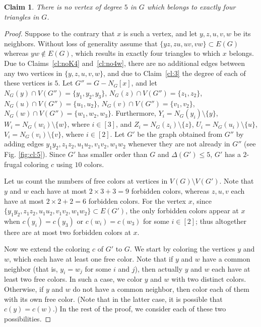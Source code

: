 \documentclass[10pt,a4paper]{article}
\newtheorem{claim}{Claim}
\begin{document}
\begin{claim} There is no vertex of degree $5$ in $G$ which belongs to exactly four triangles in $G$.
\label{cl:5}
\end{claim} 
\begin{proof}
Suppose to the contrary that $x$ is such a vertex, and let $y,z,u,v, w$ be its neighbors. Without loss of generality assume that   $\{yz,zu,uv,vw\}\subset E(G)$ whereas $yw\notin E(G)$, which results in exactly four triangles to which $x$ belongs. Due to Claims~\ref{cl:noK4} and~\ref{cl:no4w}, there are no additional edges between any two vertices in $\{y,z,u,v,w\}$, and due to Claim~\ref{cl:3} the degree of each of these vertices is $5$. Let $G''=G-N_G[x]$,  and let $N_G(y)\cap V(G'')=\{y_1,y_2,y_3\}$,  $N_G(z)\cap V(G'')=\{z_1,z_2\}$, $N_G(u)\cap V(G'')=\{u_1,u_2\}$, $N_G(v)\cap V(G'')=\{v_1,v_2\}$, $N_G(w)\cap V(G'')=\{w_1,w_2,w_3\}$. Furthermore, $Y_i =N_G(y_i)\setminus\{y\}$, $W_i =N_G(w_i)\setminus\{w\}$, where $i\in[3]$, and $Z_i =N_G(z_i)\setminus\{z\}$, $U_i =N_G(u_i)\setminus\{u\}$, $V_i =N_G(v_i)\setminus\{v\}$, where $i\in [2]$. 
Let $G'$ be the graph obtained from $G''$ by adding edges $y_1y_2,z_1z_2,u_1u_2,v_1v_2, w_1w_2$ whenever they are not already in $G''$ (see Fig. \ref{fig:cl:5}). Since $G'$ has smaller order than $G$ and $\Delta(G')\le 5$, $G'$ has a $2$-frugal coloring $c$ using $10$ colors.

Let us count the numbers of free colors at vertices in $V(G)\setminus V(G')$. Note that $y$ and $w$ each have at most 
$2\times 3+ 3=9$ forbidden colors, whereas $z,u,v$ each have at most  $2\times 2+2=6$ forbidden colors. For the vertex $x$, since $\{y_1y_2,z_1z_2,u_1u_2,v_1v_2,w_1w_2\}\subset E(G')$, the only forbidden colors appear at $x$ when $c(y_i)=c(y_3)$ or $c(w_i)=c(w_3)$ for some $i\in [2]$; thus altogether there are at most two forbidden colors at $x$. 

Now we extend the coloring $c$ of $G'$ to $G$. We start by coloring the vertices $y$ and $w$, which each have at least one free color. Note that if $y$ and $w$ have a common neighbor (that is, $y_i=w_j$ for some $i$ and $j$), then actually $y$ and $w$ each have at least two free colors. In such a case, we color $y$ and $w$ with two distinct colors. Otherwise, if $y$ and $w$ do not have a common neighbor, then color each of them with its own free color. (Note that in the latter case, it is possible that $c(y)=c(w)$.)
In the rest of the proof, we consider each of these two possibilities.


\end{proof}
\end{document}
